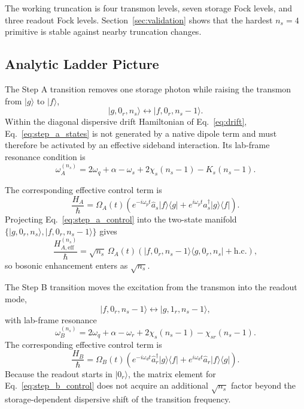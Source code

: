 \documentclass[aps,pra,twocolumn,reprint,floatfix,amsmath,amssymb]{revtex4-2}
\newcommand{\ket}[1]{\lvert #1 \rangle}
\newcommand{\bra}[1]{\langle #1 \rvert}
\begin{document}
The working truncation is four transmon levels, seven storage Fock levels, and three readout Fock levels. Section~\ref{sec:validation} shows that the hardest \(n_s=4\) primitive is stable against nearby truncation changes.

\subsection{Analytic Ladder Picture}
The Step A transition removes one storage photon while raising the transmon from \(\ket{g}\) to \(\ket{f}\),
\begin{equation}
\ket{g,0_r,n_s}\leftrightarrow\ket{f,0_r,n_s-1}.
\label{eq:step_a_states}
\end{equation}
Within the diagonal dispersive drift Hamiltonian of Eq.~\eqref{eq:drift}, Eq.~\eqref{eq:step_a_states} is not generated by a native dipole term and must therefore be activated by an effective sideband interaction. Its lab-frame resonance condition is
\begin{equation}
\omega_A^{(n_s)}
= 2\omega_q+\alpha-\omega_s+2\chi_s(n_s-1)-K_s(n_s-1).
\label{eq:step_a_resonance}
\end{equation}

The corresponding effective control term is
\begin{equation}
\frac{H_A}{\hbar}
= \Omega_A(t)\left(
e^{-i\omega_p t}\hat{a}_s \ket{f}\!\bra{g}
+ e^{i\omega_p t}\hat{a}_s^\dagger \ket{g}\!\bra{f}
\right).
\label{eq:step_a_control}
\end{equation}
Projecting Eq.~\eqref{eq:step_a_control} into the two-state manifold
\(\{\ket{g,0_r,n_s},\ket{f,0_r,n_s-1}\}\) gives
\begin{equation}
\frac{H_{A,\mathrm{eff}}^{(n_s)}}{\hbar}
= \sqrt{n_s}\,\Omega_A(t)
\left(
\ket{f,0_r,n_s-1}\!\bra{g,0_r,n_s}
+ \mathrm{h.c.}
\right),
\label{eq:step_a_projected}
\end{equation}
so bosonic enhancement enters as \(\sqrt{n_s}\).

The Step B transition moves the excitation from the transmon into the readout mode,
\begin{equation}
\ket{f,0_r,n_s-1}\leftrightarrow\ket{g,1_r,n_s-1},
\label{eq:step_b_states}
\end{equation}
with lab-frame resonance
\begin{equation}
\omega_B^{(n_s)}
= 2\omega_q+\alpha-\omega_r+2\chi_s(n_s-1)-\chi_{sr}(n_s-1).
\label{eq:step_b_resonance}
\end{equation}
The corresponding effective control term is
\begin{equation}
\frac{H_B}{\hbar}
= \Omega_B(t)\left(
e^{-i\omega_d t}\hat{a}_r^\dagger \ket{g}\!\bra{f}
+ e^{i\omega_d t}\hat{a}_r \ket{f}\!\bra{g}
\right).
\label{eq:step_b_control}
\end{equation}
Because the readout starts in \(\ket{0_r}\), the matrix element for Eq.~\eqref{eq:step_b_control} does not acquire an additional \(\sqrt{n_s}\) factor beyond the storage-dependent dispersive shift of the transition frequency.
\end{document}
